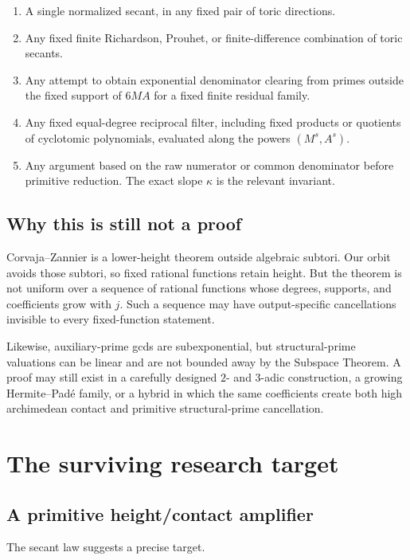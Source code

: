 \documentclass[11pt,oneside]{article}
\theoremstyle{definition}
\theoremstyle{remark}
\begin{document}
\begin{enumerate}
\item A single normalized secant, in any fixed pair of toric directions.
\item Any fixed finite Richardson, Prouhet, or finite-difference combination of toric
secants.
\item Any attempt to obtain exponential denominator clearing from primes outside the fixed
support of $6MA$ for a fixed finite residual family.
\item Any fixed equal-degree reciprocal filter, including fixed products or quotients of
cyclotomic polynomials, evaluated along the powers $(M^s,A^s)$.
\item Any argument based on the raw numerator or common denominator before primitive
reduction.  The exact slope $\kappa$ is the relevant invariant.
\end{enumerate}

\subsection{Why this is still not a proof}

Corvaja--Zannier is a lower-height theorem outside algebraic subtori.  Our orbit avoids those
subtori, so fixed rational functions retain height.  But the theorem is not uniform over a
sequence of rational functions whose degrees, supports, and coefficients grow with $j$.
Such a sequence may have output-specific cancellations invisible to every fixed-function
statement.

Likewise, auxiliary-prime gcds are subexponential, but structural-prime valuations can be
linear and are not bounded away by the Subspace Theorem.  A proof may still exist in a
carefully designed $2$- and $3$-adic construction, a growing Hermite--Pad\'e family, or a
hybrid in which the same coefficients create both high archimedean contact and primitive
structural-prime cancellation.

\section{The surviving research target}
\label{sec:target}

\subsection{A primitive height/contact amplifier}

The secant law suggests a precise target.
\end{document}
